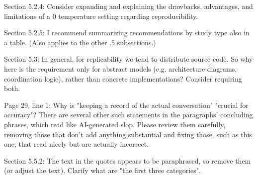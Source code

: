 \documentclass[12pt,english]{reviewresponse}
\begin{document}
\begin{revcomment}
Section 5.2.4: Consider expanding and explaining the drawbacks, advantages, and limitations of a 0 temperature setting regarding reproducibility.
\end{revcomment}
\begin{revresponse}
\end{revresponse}

\begin{revcomment}
Section 5.2.5: I recommend summarizing recommendations by study type also in a table. (Also applies to the other .5 subsections.)
\end{revcomment}
\begin{revresponse}
\end{revresponse}

\begin{revcomment}
Section 5.3: In general, for replicability we tend to distribute source code. So why here is the requirement only for abstract models (e.g. architecture diagrams, coordination logic), rather than concrete implementations? Consider requiring both.
\end{revcomment}
\begin{revresponse}
\end{revresponse}

\begin{revcomment}
Page 29, line 1: Why is "keeping a record of the actual conversation" "crucial for accuracy"? There are several other such statements in the paragraphs' concluding phrases, which read like AI-generated slop. Please review them carefully, removing those that don't add anything substantial and fixing those, such as this one, that read nicely but are actually incorrect.
\end{revcomment}
\begin{revresponse}
\end{revresponse}

\begin{revcomment}
Section 5.5.2: The text in the quotes appears to be paraphrased, so remove them (or adjust the text). Clarify what are "the first three categories".
\end{revcomment}
\begin{revresponse}
\end{revresponse}
\end{document}
